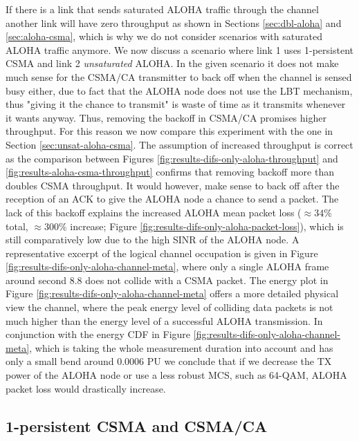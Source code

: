If there is a link that sends saturated ALOHA traffic through the channel another link will have zero throughput as shown in Sections \ref{sec:dbl-aloha} and \ref{sec:aloha-csma}, which is why we do not consider scenarios with saturated ALOHA traffic anymore. We now discuss a scenario where link 1 uses 1-persistent CSMA and link 2 \emph{unsaturated} ALOHA. In the given scenario it does not make much sense for the CSMA/CA transmitter to back off when the channel is sensed busy either, due to fact that the ALOHA node does not use the LBT mechanism, thus "giving it the chance to transmit" is waste of time as it transmits whenever it wants anyway. Thus, removing the backoff in CSMA/CA promises higher throughput. For this reason we now compare this experiment with the one in Section \ref{sec:unsat-aloha-csma}. The assumption of increased throughput is correct as the comparison between Figures \ref{fig:results-difs-only-aloha-throughput} and \ref{fig:results-aloha-csma-throughput} confirms that removing backoff more than doubles CSMA throughput. It would however, make sense to back off after the reception of an ACK to give the ALOHA node a chance to send a packet. The lack of this backoff explains the increased ALOHA mean packet loss ($\approx 34\%$ total, $\approx 300\%$ increase;  Figure \ref{fig:results-difs-only-aloha-packet-loss}), which is still comparatively low due to the high SINR of the ALOHA node. A representative excerpt of the logical channel occupation is given in Figure \ref{fig:results-difs-only-aloha-channel-meta}, where only a single ALOHA frame around second 8.8 does not collide with a CSMA packet. The energy plot in Figure  \ref{fig:results-difs-only-aloha-channel-meta} offers a more detailed physical view the channel, where the peak energy level of colliding data packets is not much higher than the energy level of a successful ALOHA transmission. In conjunction with the energy CDF in Figure \ref{fig:results-difs-only-aloha-channel-meta}, which is taking the whole measurement duration into account and has only a small bend around 0.0006 PU we conclude that if we decrease the TX power of the ALOHA node or use a less robust MCS, such as 64-QAM, ALOHA packet loss would drastically increase. 

\clearpage

\subsection{1-persistent CSMA and CSMA/CA}

